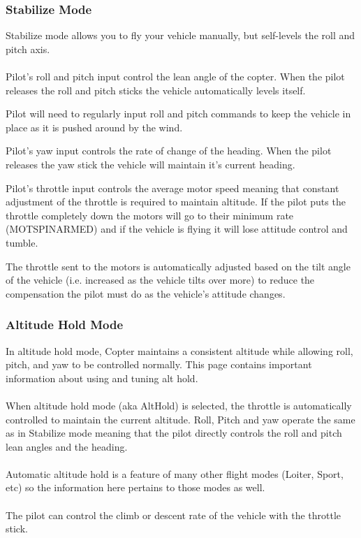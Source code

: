 \subsubsection{Stabilize Mode}
Stabilize mode allows you to fly your vehicle manually, but self-levels the roll and pitch axis.
\\\\
Pilot’s roll and pitch input control the lean angle of the copter. When the pilot releases the roll and pitch sticks the vehicle automatically levels itself.
    
    Pilot will need to regularly input roll and pitch commands to keep the vehicle in place as it is pushed around by the wind.
    
    Pilot’s yaw input controls the rate of change of the heading. When the pilot releases the yaw stick the vehicle will maintain it’s current heading.
    
    Pilot’s throttle input controls the average motor speed meaning that constant adjustment of the throttle is required to maintain altitude. If the pilot puts the throttle completely down the motors will go to their minimum rate (MOTSPINARMED) and if the vehicle is flying it will lose attitude control and tumble.
    
    The throttle sent to the motors is automatically adjusted based on the tilt angle of the vehicle (i.e. increased as the vehicle tilts over more) to reduce the compensation the pilot must do as the vehicle’s attitude changes.

\subsubsection{Altitude Hold Mode}
In altitude hold mode, Copter maintains a consistent altitude while allowing roll, pitch, and yaw to be controlled normally. This page contains important information about using and tuning alt hold.
\\\\
When altitude hold mode (aka AltHold) is selected, the throttle is automatically controlled to maintain the current altitude. Roll, Pitch and yaw operate the same as in Stabilize mode meaning that the pilot directly controls the roll and pitch lean angles and the heading.
\\\\
Automatic altitude hold is a feature of many other flight modes (Loiter, Sport, etc) so the information here pertains to those modes as well.
\\\\
The pilot can control the climb or descent rate of the vehicle with the throttle stick.

